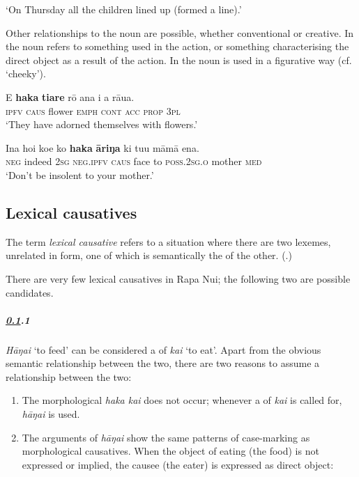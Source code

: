 \glt
‘On Thursday all the children lined up (formed a line).’ \textstyleExampleref{[R334.139]} 
\z

Other relationships to the noun are possible, whether conventional or creative. In  the noun refers to something used in the action, or something characterising the direct object as a result of the action. In  the noun is used in a figurative way (cf.  ‘cheeky’). 

\ea\label{ex:8.253}
\gll E \textbf{haka} \textbf{tiare} rō {\ꞌ}ana i a rāua. \\
\textsc{ipfv} \textsc{caus} flower \textsc{emph} \textsc{cont} \textsc{acc} \textsc{prop} \textsc{3pl} \\

\glt 
‘They have adorned themselves with flowers.’ \textstyleExampleref{[R416.415]} 
\z

\ea\label{ex:8.254}
\gll {\ꞌ}Ina ho{\ꞌ}i koe ko \textbf{haka} \textbf{{\ꞌ}āriŋa} ki tu{\ꞌ}u māmā ena.\\
\textsc{neg} indeed \textsc{2sg} \textsc{neg.ipfv} \textsc{caus} face to \textsc{poss.2sg.o} mother \textsc{med}\\

\glt 
‘Don’t be insolent to your mother.’ \textstyleExampleref{[R103.065]} 
\z

\subsection{Lexical causatives}\label{sec:8.12.7}

The term \textit{lexical causative} refers to a situation where there are two lexemes, unrelated in form, one of which is semantically the  of the other. (\citealt[248]{Dixon2012}.) 

There are very few lexical causatives in Rapa Nui; the following two are possible candidates.

\subparagraph{\ref{sec:8.12.7}.1} \textit{Hāŋai} ‘to feed’ can be considered a  of \textit{kai} ‘to eat’. Apart from the obvious semantic relationship between the two, there are two reasons to assume a  relationship between the two:

\begin{enumerate}
\item 
The morphological  \textit{haka kai} does not occur; whenever a  of \textit{kai} is called for, \textit{hāŋai} is used. 

\item 
The arguments of \textit{hāŋai} show the same patterns of case-marking as morphological causatives. When the object of eating (the food) is not expressed or implied, the causee (the eater) is expressed as direct object:

\end{enumerate}

